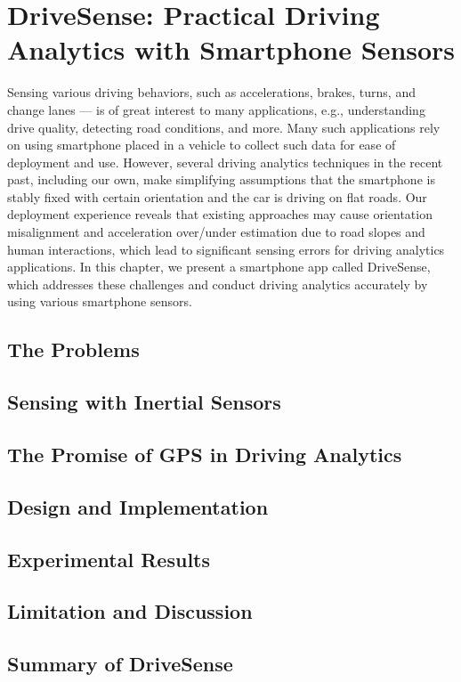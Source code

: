 
\chapter{DriveSense: Practical Driving Analytics with Smartphone Sensors} 
\label{chapter_drivesense}

Sensing various driving behaviors, such as accelerations, brakes,
turns, and change lanes — is of great interest to many applications,
e.g., understanding drive quality, detecting road conditions, and
more. Many such applications rely on using smartphone placed in a
vehicle to collect such data for ease of deployment and use. However,
several driving analytics techniques in the recent past, including
our own, make simplifying assumptions that the smartphone is
stably fixed with certain orientation and the car is driving on flat
roads. Our deployment experience reveals that existing approaches
may cause orientation misalignment and acceleration over/under
estimation due to road slopes and human interactions, which lead
to significant sensing errors for driving analytics applications.
In this chapter, we present a smartphone app called DriveSense,
which addresses these challenges and conduct driving analytics
accurately by using various smartphone sensors.  


\section{The Problems}



\section{Sensing with Inertial Sensors}
\label{imusensors}



\section{The Promise of GPS in Driving Analytics}
\label{gps}



\section{Design and Implementation}
\label{design_implement}


\section{Experimental Results}
\label{evaluation}



\section{Limitation and Discussion}




\section{Summary of DriveSense}





